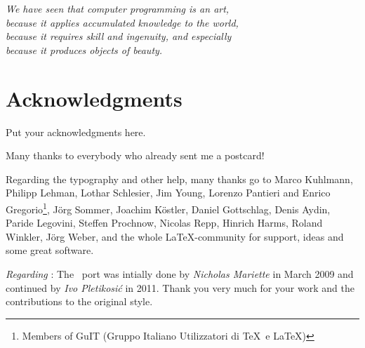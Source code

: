 
\begin{flushright}{\slshape    
    We have seen that computer programming is an art, \\ 
    because it applies accumulated knowledge to the world, \\ 
    because it requires skill and ingenuity, and especially \\
    because it produces objects of beauty.} \\ \medskip

\end{flushright}



\bigskip

\begingroup
\let\clearpage\relax
\let\cleardoublepage\relax
\let\cleardoublepage\relax
\chapter*{Acknowledgments}
Put your acknowledgments here.

Many thanks to everybody who already sent me a postcard!

Regarding the typography and other help, many thanks go to Marco 
Kuhlmann, Philipp Lehman, Lothar Schlesier, Jim Young, Lorenzo 
Pantieri and Enrico Gregorio\footnote{Members of GuIT (Gruppo 
Italiano Utilizzatori di \TeX\ e \LaTeX )}, J\"org Sommer, 
Joachim K\"ostler, Daniel Gottschlag, Denis Aydin, Paride 
Legovini, Steffen Prochnow, Nicolas Repp, Hinrich Harms, 
 Roland Winkler, J\"org Weber, 
 and the whole \LaTeX-community for support, ideas and 
 some great software.

\bigskip

\noindent\emph{Regarding \mLyX}: The \mLyX\ port was intially done by 
\emph{Nicholas Mariette} in March 2009 and continued by 
\emph{Ivo Pletikosi\'c} in 2011. Thank you very much for your 
work and the contributions to the original style.


\endgroup



